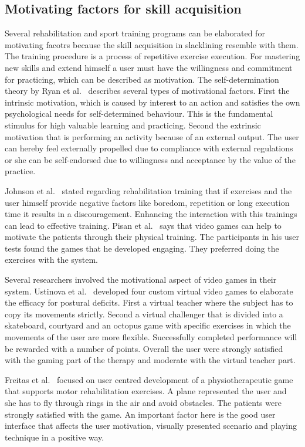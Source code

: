 \subsection{Motivating factors for skill acquisition}

Several rehabilitation and sport training programs can be elaborated for motivating facotrs because the skill acquisition in slacklining resemble with them. The training procedure is a process of repetitive exercise execution. For mastering new skills and extend himself a user must have the willingness and commitment for practicing, which can be described as motivation. The self-determination theory by Ryan et al.~\cite{Ryan2000-jn, Ryan2000-gi} describes several types of motivational factors. First the intrinsic motivation, which is caused by interest to an action and satisfies the own psychological needs for self-determined behaviour. This is the fundamental stimulus for high valuable learning and practicing. Second the extrinsic motivation that is performing an activity because of an external output. The user can hereby feel externally propelled due to compliance with external regulations or she can be self-endorsed due to willingness and acceptance by the value of the practice. 

Johnson et al.~\cite{Johnson1998-hb} stated regarding rehabilitation training that if exercises and the user himself provide negative factors like boredom, repetition or long execution time it results in a discouragement. Enhancing the interaction with this trainings can lead to effective training. 
Pisan et al.~\cite{Pisan2013-sf} says that video games can help to motivate the patients through their physical training. The participants in his user tests found the games that he developed engaging. They preferred doing the exercises with the system.

Several researchers involved the motivational aspect of video games in their system. Ustinova et al.~\cite{Ustinova2014-ml} developed four custom virtual video games to elaborate the efficacy for postural deficits. First a virtual teacher where the subject has to copy its movements strictly. Second a virtual challenger that is divided into a skateboard, courtyard and an octopus game with specific exercises in which the movements of the user are more flexible. Successfully completed performance will be rewarded with a number of points. Overall the user were strongly satisfied with the gaming part of the therapy and moderate with the virtual teacher part.

Freitas et al.~\cite{Freitas2012-ae} focused on user centred development of a physiotherapeutic game that supports motor rehabilitation exercises. A plane represented the user and she has to fly through rings in the air and avoid obstacles. The patients were strongly satisfied with the game. An important factor here is the good user interface that affects the user motivation, visually presented scenario and playing technique in a positive way.

